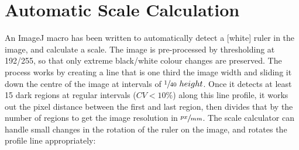 \documentclass[a4paper]{scrartcl}
\begin{document}
\section{Automatic Scale Calculation}
\label{sec:scale-calc}


An ImageJ macro has been written to automatically detect a [white]
ruler in the image, and calculate a scale. The image is pre-processed
by thresholding at 192/255, so that only extreme black/white colour
changes are preserved. The process works by creating a line that is
one third the image width and sliding it down the centre of the image
at intervals of $\sfrac{1}{40}~height$. Once it detects at least 15
dark regions at regular intervals ($CV < 10\%$) along this line
profile, it works out the pixel distance between the first and last
region, then divides that by the number of regions to get the image
resolution in $\sfrac{px}{mm}$. The scale calculator can handle small
changes in the rotation of the ruler on the image, and rotates the
profile line appropriately:
\end{document}
